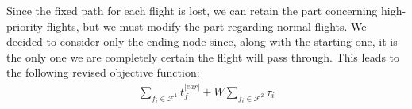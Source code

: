\documentclass[../thesis.tex]{subfiles}
\begin{document}
Since the fixed path for each flight is lost, we can retain the part concerning high-priority flights, but we must modify the part regarding normal flights.  
We decided to consider only the ending node since, along with the starting one, it is the only one we are completely certain the flight will pass through.  
This leads to the following revised objective function:  
\begin{align}\label{eq:obj:MercedesFree}
\sum_{f_i \in \mathcal{F}^1} t^{|ear|}_{f}+
W\sum_{f_i\in \mathcal{F}^2}\tau_i
\end{align}
\end{document}

